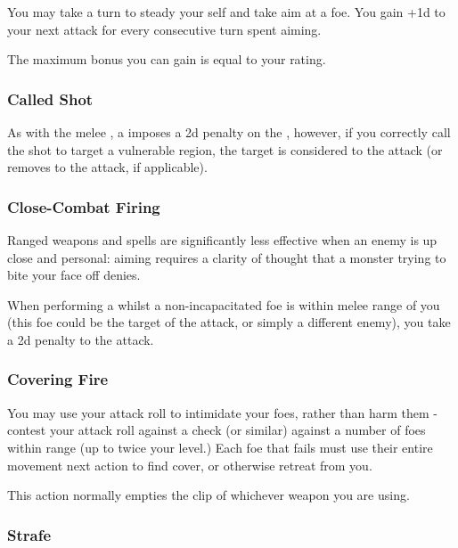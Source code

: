 You may take a turn to steady your self and take aim at a foe. You gain +1d to your next attack for every consecutive turn spent aiming. 

The maximum bonus you can gain is equal to your  rating. 

\subsubsection{Called Shot}

As with the melee , a  imposes a 2d penalty on the , however, if you correctly call the shot to target a vulnerable region, the target is considered  to the attack (or removes  to the attack, if applicable).

\subsubsection{Close-Combat Firing}

Ranged weapons and spells are significantly less effective when an enemy is up close and personal: aiming requires a clarity of thought that a monster trying to bite your face off denies. 

When performing a  whilst a non-incapacitated foe is within melee range of you (this foe could be the target of the attack, or simply a different enemy), you take a 2d penalty to the attack. 


\subsubsection{Covering Fire}

You may use your attack roll to intimidate your foes, rather than harm them - contest your attack roll against a  check (or similar) against a number of foes within range (up to twice your  level.) Each foe that fails must use their entire movement next action to find cover, or otherwise retreat from you. 

This action normally empties the clip of whichever weapon you are using. 


\subsubsection{Strafe}

